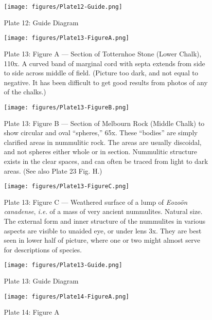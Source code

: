 \documentclass[a4paper, 12pt, oneside]{article}
\begin{document}
\clearpage
\begin{figure}[b]
\centering
\texttt{[image: figures/Plate12-Guide.png]}
\caption{\small Plate 12: Guide Diagram}
\end{figure}
\clearpage
{}
\cfoot{\thepage}
\begin{figure}[b]
\centering
\texttt{[image: figures/Plate13-FigureA.png]}
\caption{\small Plate 13: Figure A --- Section of Totternhoe Stone (Lower Chalk), 110x. A curved band of marginal cord with septa extends from side to side across middle of field. (Picture too dark, and not equal to negative. It has been difficult to get good results from photos of any of the chalks.)}
\end{figure}
\clearpage
\begin{figure}[b]
\centering
\texttt{[image: figures/Plate13-FigureB.png]}
\caption{\small Plate 13: Figure B --- Section of Melbourn Rock (Middle Chalk) to show circular and oval ``spheres,'' 65x. These ``bodies'' are simply clarified areas in nummulitic rock. The areas are usually discoidal, and not spheres either whole or in section. Nummulitic structure exists in the clear spaces, and can often be traced from light to dark areas. (See also Plate 23 Fig. H.)}
\end{figure}
\clearpage
\begin{figure}[b]
\centering
\texttt{[image: figures/Plate13-FigureC.png]}
\caption{\small Plate 13: Figure C --- Weathered surface of a lump of \emph{Eozoön canadense}, \emph{i.e.} of a mass of very ancient nummulites. Natural size. The external form and inner structure of the nummulites in various aspects are visible to unaided eye, or under lens 3x. They are best seen in lower half of picture, where one or two might almost serve for descriptions of species.}
\end{figure}
\clearpage
\begin{figure}[b]
\centering
\texttt{[image: figures/Plate13-Guide.png]}
\caption{\small Plate 13: Guide Diagram}
\end{figure}
\clearpage
{}
\cfoot{\thepage}
\begin{figure}[b]
\centering
\texttt{[image: figures/Plate14-FigureA.png]}
\caption{\small Plate 14: Figure A}
\end{figure}
\end{document}
